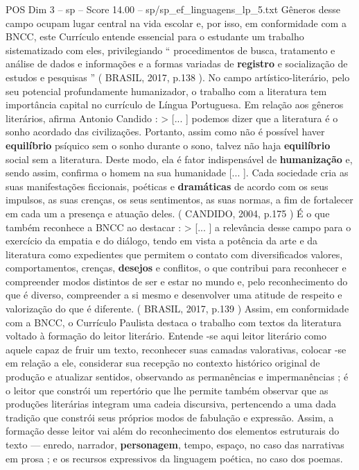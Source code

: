 \begin{textsample}{POS Dim 3 – sp – Score 14.00 – sp/sp\_ef\_linguagens\_lp\_5.txt}
Gêneros desse campo ocupam lugar central na vida escolar e, por isso, em conformidade com a BNCC, este Currículo entende essencial para o estudante um trabalho sistematizado com eles, privilegiando “ procedimentos de busca, tratamento e análise de dados e informações e a formas variadas de \textbf{registro} e socialização de estudos e pesquisas ” ( BRASIL, 2017, p.138 ).
No campo artístico-literário, pelo seu potencial profundamente humanizador, o trabalho com a literatura tem importância capital no currículo de Língua Portuguesa.
Em relação aos gêneros literários, afirma Antonio Candido : > [... ] podemos dizer que a literatura é o sonho acordado das civilizações.
Portanto, assim como não é possível haver \textbf{equilíbrio} psíquico sem o sonho durante o sono, talvez não haja \textbf{equilíbrio} social sem a literatura.
Deste modo, ela é fator indispensável de \textbf{humanização} e, sendo assim, confirma o homem na sua humanidade [... ].
Cada sociedade cria as suas manifestações ficcionais, poéticas e \textbf{dramáticas} de acordo com os seus impulsos, as suas crenças, os seus sentimentos, as suas normas, a fim de fortalecer em cada um a presença e atuação deles. ( CANDIDO, 2004, p.175 ) É o que também reconhece a BNCC ao destacar : > [... ] a relevância desse campo para o exercício da empatia e do diálogo, tendo em vista a potência da arte e da literatura como expedientes que permitem o contato com diversificados valores, comportamentos, crenças, \textbf{desejos} e conflitos, o que contribui para reconhecer e compreender modos distintos de ser e estar no mundo e, pelo reconhecimento do que é diverso, compreender a si mesmo e desenvolver uma atitude de respeito e valorização do que é diferente. ( BRASIL, 2017, p.139 ) Assim, em conformidade com a BNCC, o Currículo Paulista destaca o trabalho com textos da literatura voltado à formação do leitor literário.
Entende -se aqui leitor literário como aquele capaz de fruir um texto, reconhecer suas camadas valorativas, colocar -se em relação a ele, considerar sua recepção no contexto histórico original de produção e atualizar sentidos, observando as permanências e impermanências ; é o leitor que constrói um repertório que lhe permite também observar que as produções literárias integram uma cadeia discursiva, pertencendo a uma dada tradição que constrói seus próprios modos de fabulação e expressão.
Assim, a formação desse leitor vai além do reconhecimento dos elementos estruturais do texto — enredo, narrador, \textbf{personagem}, tempo, espaço, no caso das narrativas em prosa ; e os recursos expressivos da linguagem poética, no caso dos poemas.

\end{textsample}
